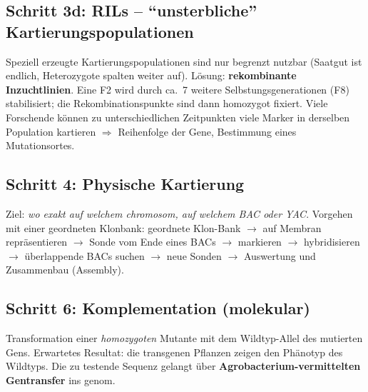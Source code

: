 
\subsection*{Schritt 3d: RILs -- ``unsterbliche'' Kartierungspopulationen}\label{subsec:schritt-3d:-rils----``unsterbliche''-kartierungspopulationen}
Speziell erzeugte Kartierungspopulationen sind nur begrenzt nutzbar (Saatgut ist endlich, Heterozygote spalten weiter auf).
Lösung: \textbf{rekombinante Inzuchtlinien}.
Eine F2 wird durch ca.\ 7 weitere Selbstungsgenerationen (F8) stabilisiert; die Rekombinationspunkte sind dann homozygot fixiert.
Viele Forschende können zu unterschiedlichen Zeitpunkten viele Marker in derselben Population kartieren $\Rightarrow$ Reihenfolge der Gene, Bestimmung eines Mutationsortes.


\subsection*{Schritt 4: Physische Kartierung}\label{subsec:schritt-4:-physische-kartierung}
Ziel: \emph{wo exakt auf welchem \gls{chromosom}, auf welchem BAC oder YAC}.
Vorgehen mit einer geordneten Klonbank:
geordnete Klon-Bank $\to$ auf Membran repräsentieren $\to$ Sonde vom Ende eines BACs $\to$ markieren $\to$ hybridisieren $\to$ überlappende BACs suchen $\to$ neue Sonden $\to$ Auswertung und Zusammenbau (Assembly).


\subsection*{Schritt 6: Komplementation (molekular)}\label{subsec:schritt-6:-komplementation-(molekular)}
Transformation einer \emph{homozygoten} Mutante mit dem Wildtyp-Allel des mutierten Gens.
Erwartetes Resultat: die transgenen Pflanzen zeigen den Phänotyp des Wildtyps.
Die zu testende Sequenz gelangt über \textbf{Agrobacterium-vermittelten Gentransfer} ins \gls{genom}.

